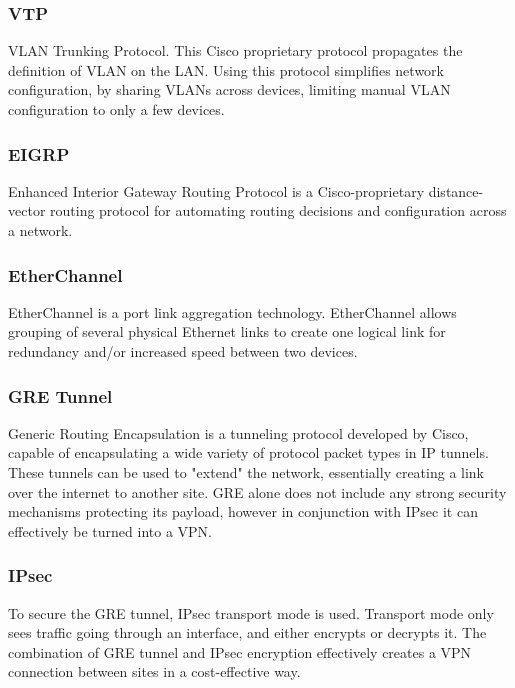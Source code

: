 \subsubsection{VTP}
VLAN Trunking Protocol.
This Cisco proprietary protocol propagates the definition of VLAN on the LAN.\cite{VTP} 
Using this protocol simplifies network configuration, by sharing VLANs across devices, limiting manual VLAN configuration to only a few devices.

\subsubsection{EIGRP}
Enhanced Interior Gateway Routing Protocol is a Cisco-proprietary distance-vector routing protocol for automating routing decisions and configuration across a network. \cite{EIGRP}

\subsubsection{EtherChannel}
EtherChannel is a port link aggregation technology. EtherChannel allows grouping of several physical Ethernet links to create one logical link for redundancy and/or increased speed between two devices. \cite{EtherChannel}

\subsubsection{GRE Tunnel}
\vspace{-0.8em}
Generic Routing Encapsulation is a tunneling protocol developed by Cisco, capable of encapsulating a wide variety of protocol packet types in IP tunnels. \cite{CCNP-ROUTE}
These tunnels can be used to "extend" the network, essentially creating a link over the internet to another site.
GRE alone does not include any strong security mechanisms protecting its payload, however in conjunction with IPsec it can effectively be turned into a VPN.

\subsubsection{IPsec}
\vspace{-0.8em}
To secure the GRE tunnel, IPsec transport mode is used.
Transport mode only sees traffic going through an interface, and either encrypts or decrypts it. 
The combination of GRE tunnel and IPsec encryption effectively creates a VPN connection between sites in a cost-effective way.

